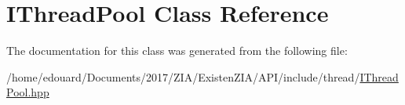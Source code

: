 \hypertarget{classIThreadPool}{}\section{I\+Thread\+Pool Class Reference}
\label{classIThreadPool}


The documentation for this class was generated from the following file\+:\begin{DoxyCompactItemize}
\item 
/home/edouard/\+Documents/2017/\+Z\+I\+A/\+Existen\+Z\+I\+A/\+A\+P\+I/include/thread/\mbox{\hyperlink{IThreadPool_8hpp}{I\+Thread\+Pool.\+hpp}}\end{DoxyCompactItemize}
